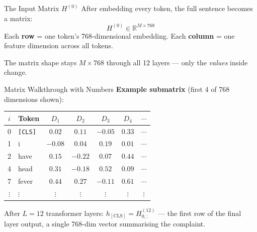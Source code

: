 \documentclass[10pt,aspectratio=169]{beamer}
\begin{document}
\begin{frame}{The Input Matrix $H^{(0)}$}
	\small
	After embedding every token, the full sentence becomes a matrix:
	\[
		H^{(0)} \in \mathbb{R}^{M \times 768}
	\]
	Each \textbf{row} = one token's 768-dimensional embedding. Each \textbf{column} = one feature dimension across all tokens.

	\vspace{0.15cm}
	\centering

	\vspace{0.1cm}
	\footnotesize The matrix shape stays $M \times 768$ through all 12 layers --- only the \textit{values} inside change.
\end{frame}

\begin{frame}{Matrix Walkthrough with Numbers}
	\footnotesize
	\textbf{Example submatrix} (first 4 of 768 dimensions shown):
	\begin{tabular}{|c|l|c|c|c|c|c|}
		\hline
		\textbf{$i$} & \textbf{Token} & $D_1$ & $D_2$ & $D_3$ & $D_4$ & $\cdots$ \\
		\hline
		0 & \texttt{[CLS]} & $0.02$ & $0.11$ & $-0.05$ & $0.33$ & $\cdots$ \\
		\hline
		1 & i & $-0.08$ & $0.04$ & $0.19$ & $0.01$ & $\cdots$ \\
		\hline
		2 & have & $0.15$ & $-0.22$ & $0.07$ & $0.44$ & $\cdots$ \\
		\hline
		4 & head & $0.31$ & $-0.18$ & $0.52$ & $0.09$ & $\cdots$ \\
		\hline
		7 & fever & $0.44$ & $0.27$ & $-0.11$ & $0.61$ & $\cdots$ \\
		\hline
		$\vdots$ & $\vdots$ & $\vdots$ & $\vdots$ & $\vdots$ & $\vdots$ & $\vdots$ \\
		\hline
	\end{tabular}

	\vspace{0.15cm}
	\small
	After $L=12$ transformer layers: $h_{\mathrm{[CLS]}} = H^{(12)}_{0,:}$ --- the first row of the final layer output, a single 768-dim vector summarising the complaint.
\end{frame}
\end{document}
